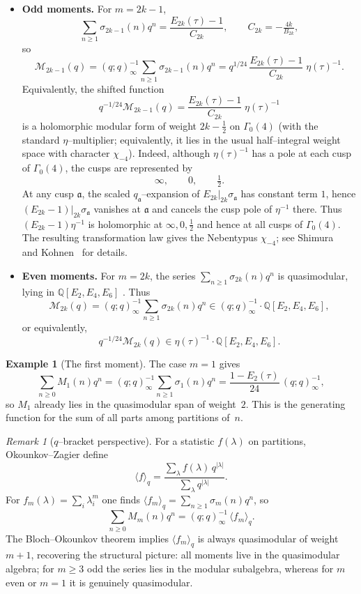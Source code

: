 \documentclass[11pt]{article}
\theoremstyle{definition}
\newtheorem{example}[theorem]{Example}
\theoremstyle{remark}
\newtheorem{remark}[theorem]{Remark}
\begin{document}
\begin{itemize}
  \item \textbf{Odd moments.} For $m=2k-1$,
  \[
    \sum_{n\ge1}\sigma_{2k-1}(n)q^n=\frac{E_{2k}(\tau)-1}{C_{2k}},\qquad
    C_{2k}=-\tfrac{4k}{B_{2k}},
  \]
  so
  \[
    \mathcal{M}_{2k-1}(q)
    =(q;q)_\infty^{-1}\sum_{n\ge1}\sigma_{2k-1}(n)q^n
    = q^{1/24}\,\frac{E_{2k}(\tau)-1}{C_{2k}}\;\eta(\tau)^{-1}.
  \]
 Equivalently, the shifted function
\[
  q^{-1/24}\mathcal{M}_{2k-1}(q)
  =\frac{E_{2k}(\tau)-1}{C_{2k}}\;\eta(\tau)^{-1}
\]
is a holomorphic modular form of weight $2k-\tfrac12$ on $\Gamma_0(4)$ (with the
standard $\eta$--multiplier; equivalently, it lies in the usual half--integral
weight space with character $\chi_{-4}$).  Indeed, although $\eta(\tau)^{-1}$
has a pole at each cusp of $\Gamma_0(4)$, the cusps are represented by
\[
\infty,\qquad 0,\qquad \tfrac12.
\]
At any cusp $\mathfrak a$, the scaled $q_{\mathfrak a}$--expansion of
$E_{2k}|_{2k}\sigma_{\mathfrak a}$ has constant term $1$, hence
$(E_{2k}-1)|_{2k}\sigma_{\mathfrak a}$ vanishes at $\mathfrak a$ and cancels the
cusp pole of $\eta^{-1}$ there.  Thus $(E_{2k}-1)\eta^{-1}$ is holomorphic at
$\infty,0,\tfrac12$ and hence at all cusps of $\Gamma_0(4)$.
The resulting transformation law gives the Nebentypus $\chi_{-4}$; see
Shimura~\cite{Shimura1973} and Kohnen~\cite{Kohnen1980} for details.


  \item \textbf{Even moments.} For $m=2k$, the series
  $\sum_{n\ge1}\sigma_{2k}(n)q^n$ is quasimodular, lying in
  $\mathbb{Q}[E_2,E_4,E_6]$ \cite{KanekoZagier1995}. Thus
  \[
    \mathcal{M}_{2k}(q)
    =(q;q)_\infty^{-1}\sum_{n\ge1}\sigma_{2k}(n)q^n
    \in (q;q)_\infty^{-1}\cdot\mathbb{Q}[E_2,E_4,E_6],
  \]
  or equivalently,
  \[
    q^{-1/24}\mathcal{M}_{2k}(q)\in \eta(\tau)^{-1}\cdot\mathbb{Q}[E_2,E_4,E_6].
  \]
\end{itemize}

\begin{example}[The first moment]
The case $m=1$ gives
\[
  \sum_{n\ge0} M_1(n)q^n
  = (q;q)_\infty^{-1}\sum_{n\ge1}\sigma_1(n)q^n
  =  \frac{1-E_2(\tau)}{24}\,(q;q)_\infty^{-1},
\]
so $M_1$ already lies in the quasimodular span of weight~$2$. This is the
generating function for the sum of all parts among partitions of~$n$.
\end{example}

\begin{remark}[$q$--bracket perspective]
For a statistic $f(\lambda)$ on partitions, Okounkov--Zagier define
\[
\langle f\rangle_q=\frac{\sum_\lambda f(\lambda)\,q^{|\lambda|}}{\sum_\lambda q^{|\lambda|}}.
\]
For $f_m(\lambda)=\sum_i \lambda_i^m$ one finds
$\langle f_m\rangle_q=\sum_{n\ge1}\sigma_m(n)q^n$, so
\[
\sum_{n\ge0} M_m(n)q^n=(q;q)_\infty^{-1}\,\langle f_m\rangle_q.
\]
The Bloch--Okounkov theorem \cite{BlochOkounkov2000} implies
$\langle f_m\rangle_q$ is always quasimodular of weight $m+1$, recovering the
structural picture: all moments live in the quasimodular algebra; for
$m\ge3$ odd the series lies in the modular subalgebra, whereas for $m$ even
or $m=1$ it is genuinely quasimodular.
\end{remark}
\end{document}
